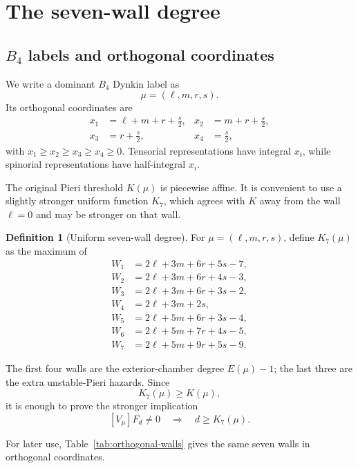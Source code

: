 \documentclass[11pt,a4paper]{article}
\theoremstyle{definition}
\newtheorem{definition}[theorem]{Definition}
\newcommand{\Kseven}{K_{7}}
\begin{document}
\section{The seven-wall degree}

\subsection{$B_4$ labels and orthogonal coordinates}

We write a dominant $B_4$ Dynkin label as
\[
   \mu=(\ell,m,r,s).
\]
Its orthogonal coordinates are
\begin{align*}
 x_1&=\ell+m+r+\frac{s}{2}, &
 x_2&=m+r+\frac{s}{2},\\
 x_3&=r+\frac{s}{2}, &
 x_4&=\frac{s}{2},
\end{align*}
with $x_1\geq x_2\geq x_3\geq x_4\geq0$.  Tensorial representations have
integral $x_i$, while spinorial representations have half-integral $x_i$.

The original Pieri threshold $K(\mu)$ is piecewise affine.  It is convenient
to use a slightly stronger uniform function $\Kseven$, which agrees with $K$
away from the wall $\ell=0$ and may be stronger on that wall.

\begin{definition}[Uniform seven-wall degree]
For $\mu=(\ell,m,r,s)$, define $\Kseven(\mu)$ as the maximum of
\begin{align*}
 W_1&=2\ell+3m+6r+5s-7,\\
 W_2&=2\ell+3m+6r+4s-3,\\
 W_3&=2\ell+3m+6r+3s-2,\\
 W_4&=2\ell+3m+2s,\\
 W_5&=2\ell+5m+6r+3s-4,\\
 W_6&=2\ell+5m+7r+4s-5,\\
 W_7&=2\ell+5m+9r+5s-9.
\end{align*}
\end{definition}

The first four walls are the exterior-chamber degree $E(\mu)-1$; the last
three are the extra unstable-Pieri hazards.  Since
\[
   \Kseven(\mu)\geq K(\mu),
\]
it is enough to prove the stronger implication
\[
   [V_\mu]F_d\neq0\quad\Longrightarrow\quad d\geq\Kseven(\mu).
\]

For later use, Table~\ref{tab:orthogonal-walls} gives the same seven walls in
orthogonal coordinates.
\end{document}
